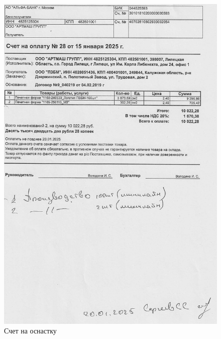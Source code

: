 \begin{figure}
\begin{center}
 \includegraphics[height=0.9\textheight, keepaspectratio]{Pics/II.8.9.jpg}
\end{center}
 \caption{Счет на оснастку}
 \label{pic:II.8.9}
\end{figure}


